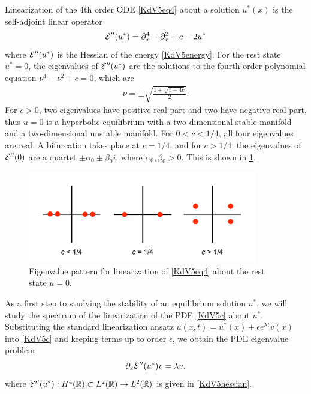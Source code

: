 \documentclass[thesis.tex]{subfiles}
\begin{document}
Linearization of the 4th order ODE \cref{KdV5eq4} about a solution $u^*(x)$ is the self-adjoint linear operator
\begin{equation}\label{KdV5hessian}
\mathcal{E}''(u^*) = \partial_x^4 - \partial_x^2 + c - 2 u^* 
\end{equation}
where $\mathcal{E}''(u^*)$ is the Hessian of the energy \cref{KdV5energy}. For the rest state $u^* = 0$, the eigenvalues of $\mathcal{E}''(u^*)$ are the solutions to the fourth-order polynomial equation $\nu^4 - \nu^2 + c = 0$, which are
\begin{align*}
\nu = \pm \sqrt{ \frac{1 \pm \sqrt{1 - 4c} }{2}}.
\end{align*}
For $c > 0$, two eigenvalues have positive real part and two have negative real part, thus $u = 0$ is a hyperbolic equilibrium with a two-dimensional stable manifold and a two-dimensional unstable manifold. For $0 < c < 1/4$, all four eigenvalues are real. A bifurcation takes place at $c = 1/4$, and for $c > 1/4$, the eigenvalues of $\mathcal{E}''(0)$ are a quartet $\pm \alpha_0 \pm \beta_0 i$, where $\alpha_0, \beta_0 > 0$. This is shown in \cref{fig:kdv5eigbif}.

\begin{figure}
\begin{center}
\includegraphics[width=10cm]{images/kdv5/A0eigbifurcation}
\end{center}
\caption[Eigenvalues of rest state for KdV5]{Eigenvalue pattern for linearization of \cref{KdV5eq4} about the rest state $u = 0$. }
\label{fig:kdv5eigbif}
\end{figure} 

As a first step to studying the stability of an equilibrium solution $u^*$, we will study the spectrum of the linearization of the PDE \eqref{KdV5c} about $u^*$. Substituting the standard linearization ansatz $u(x, t) = u^*(x) + \epsilon e^{\lambda t} v(x)$ into \eqref{KdV5c} and keeping terms up to order $\epsilon$, we obtain the PDE eigenvalue problem
\begin{equation}\label{KdV5PDEevp}
\partial_x \mathcal{E}''(u^*) v = \lambda v.
\end{equation}
where $\mathcal{E}''(u^*): H^4(\mathbb{R}) \subset L^2(\mathbb{R}) \rightarrow L^2(\mathbb{R})$ is given in \cref{KdV5hessian}.
\end{document}
